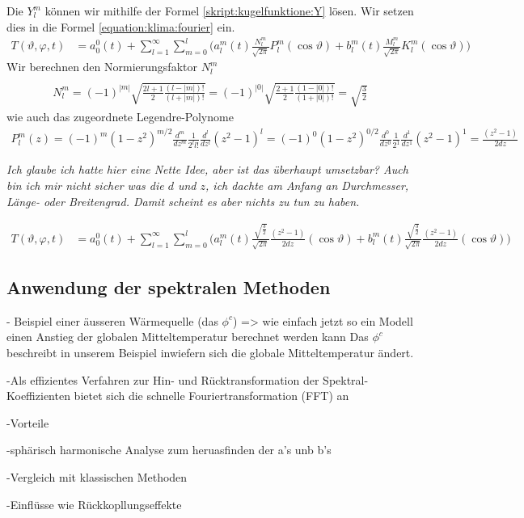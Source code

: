 \begin{refsection}
Die $Y^m_l$ können wir mithilfe der Formel \ref{skript:kugelfunktione:Y} lösen. Wir setzen dies in die Formel \eqref{equation:klima:fourier} ein.
\begin{align*}
T(\vartheta ,\varphi ,t)
&=
a^0_0(t) + \sum_{l=1}^\infty\sum_{m=0}^l \bigl( a^m_l(t)\frac{N^m_l}{\sqrt{2\pi}} P^m_l(\cos\vartheta)+b^m_l(t)\frac{M^m_l}{\sqrt{2\pi}} K^m_l(\cos\vartheta)\bigr)
\end{align*}
Wir berechnen den Normierungsfaktor $N^m_l$
\begin{align*}
\\
N^m_l
=
(-1)^{|m|}\sqrt{\frac{2l+1}{2}\frac{(l-|m|)!}{(l+|m|)!}}
=
(-1)^{|0|}\sqrt{\frac{2+1}{2}\frac{(1-|0|)!}{(1+|0|)!}}
=
\sqrt{\frac{3}{2}}
\end{align*}
wie auch das zugeordnete Legendre-Polynome
\begin{align*}
P^m_l(z)
=
(-1)^m(1-z^2)^{m/2}\frac{d^m}{dz^m}\frac{1}{2^ll!}\frac{d^l}{dz^l}(z^2-1)^l
=
(-1)^0(1-z^2)^{0/2}\frac{d^0}{dz^0}\frac{1}{2^1}\frac{d^1}{dz^1}(z^2-1)^1
=
\frac{(z^2-1)}{2dz}
\end{align*}

\textit{Ich glaube ich hatte hier eine Nette Idee, aber ist das überhaupt umsetzbar? Auch bin ich mir nicht sicher was die $d$ und $z$, ich dachte am Anfang an Durchmesser, Länge- oder Breitengrad. Damit scheint es aber nichts zu tun zu haben.}

\begin{align*}
T(\vartheta ,\varphi ,t)
&=
a^0_0(t) + \sum_{l=1}^\infty\sum_{m=0}^l \bigl( a^m_l(t)\frac{\sqrt{\frac{3}{2}}}{\sqrt{2\pi}} \frac{(z^2-1)}{2dz}(\cos\vartheta)+b^m_l(t)\frac{\sqrt{\frac{3}{2}}}{\sqrt{2\pi}} \frac{(z^2-1)}{2dz}(\cos\vartheta)\bigr)
\end{align*}




\subsection{Anwendung der spektralen Methoden}
- Beispiel einer äusseren Wärmequelle (das $\phi^c$) => wie einfach jetzt so ein Modell einen Anstieg der globalen Mitteltemperatur berechnet werden kann
Das $\phi^c$ beschreibt in unserem Beispiel inwiefern sich die globale Mitteltemperatur ändert. 


-Als effizientes Verfahren zur Hin- und Rücktransformation der Spektral-Koeffizienten bietet sich die schnelle Fouriertransformation (FFT) an

-Vorteile

-sphärisch harmonische Analyse zum heruasfinden der a's unb b's

-Vergleich mit klassischen Methoden

-Einflüsse wie Rückkopllungseffekte







\printbibliography[heading=subbibliography]
\end{refsection}